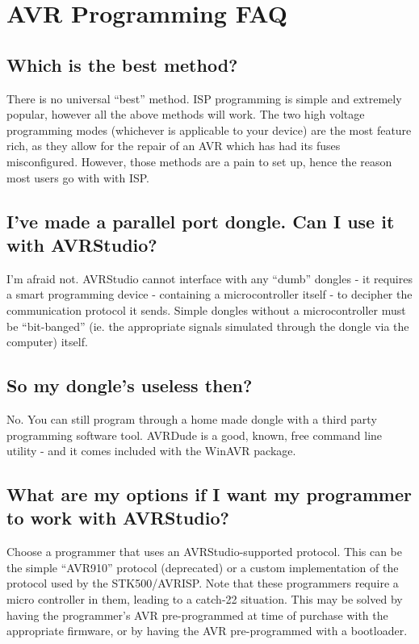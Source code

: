 \documentclass[a4paper,oneside]{book}
\begin{document}
\label{chp:faq}
\chapter{AVR Programming FAQ}

\section{Which is the best method?}
There is no universal ``best'' method. ISP programming is simple and extremely popular, however all the above methods will work. The two high voltage programming modes (whichever is applicable to your device) are the most feature rich, as they allow for the repair of an AVR which has had its fuses misconfigured. However, those methods are a pain to set up, hence the reason most users go with with ISP.

\section{I've made a parallel port dongle. Can I use it with AVRStudio?}
I'm afraid not. AVRStudio cannot interface with any ``dumb'' dongles - it requires a smart programming device - containing a microcontroller itself - to decipher the communication protocol it sends. Simple dongles without a microcontroller must be ``bit-banged'' (ie. the appropriate signals simulated through the dongle via the computer) itself.

\section{So my dongle's useless then?}
No. You can still program through a home made dongle with a third party programming software tool. AVRDude is a good, known, free command line utility - and it comes included with the WinAVR package.

\section{What are my options if I want my programmer to work with AVRStudio?}
Choose a programmer that uses an AVRStudio-supported protocol. This can be the simple ``AVR910'' protocol (deprecated) or a custom implementation of the protocol used by the STK500/AVRISP. Note that these programmers require a micro controller in them, leading to a catch-22 situation. This may be solved by having the programmer's AVR pre-programmed at time of purchase with the appropriate firmware, or by having the AVR pre-programmed with a bootloader.
\end{document}
